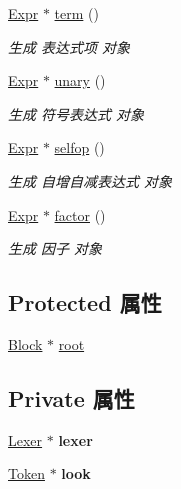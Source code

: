\begin{DoxyCompactItemize}
\hyperlink{class_expr}{Expr} $\ast$ \hyperlink{class_parser_a3809fe1d71ccaf111e4c6dc57f86640f}{term} ()
\begin{DoxyCompactList}\small\item\em 生成 表达式项 对象 \end{DoxyCompactList}\item 
\hyperlink{class_expr}{Expr} $\ast$ \hyperlink{class_parser_ac58cd88a976f4a7d147f5f815724f6a6}{unary} ()
\begin{DoxyCompactList}\small\item\em 生成 符号表达式 对象 \end{DoxyCompactList}\item 
\hyperlink{class_expr}{Expr} $\ast$ \hyperlink{class_parser_a3d5348cd92711fd39aea2b959e029e99}{selfop} ()
\begin{DoxyCompactList}\small\item\em 生成 自增自减表达式 对象 \end{DoxyCompactList}\item 
\hyperlink{class_expr}{Expr} $\ast$ \hyperlink{class_parser_ac85a997e91604de1d3505b3c8aaddf3b}{factor} ()
\begin{DoxyCompactList}\small\item\em 生成 因子 对象 \end{DoxyCompactList}\end{DoxyCompactItemize}
\subsection*{Protected 属性}
\begin{DoxyCompactItemize}
\item 
\hyperlink{class_block}{Block} $\ast$ \hyperlink{class_parser_a2c2aa893bb15b76ceea0330cad0c75cb}{root}
\end{DoxyCompactItemize}
\subsection*{Private 属性}
\begin{DoxyCompactItemize}
\item 
\hyperlink{class_lexer}{Lexer} $\ast$ {\bfseries lexer}\hypertarget{class_parser_a8a8214126b0b0455e3ce375f3e9b20bf}{}\label{class_parser_a8a8214126b0b0455e3ce375f3e9b20bf}

\item 
\hyperlink{class_token}{Token} $\ast$ {\bfseries look}\hypertarget{class_parser_ac5d56e87794ceab4e8346bf4a60a5625}{}\label{class_parser_ac5d56e87794ceab4e8346bf4a60a5625}

\end{DoxyCompactItemize}


